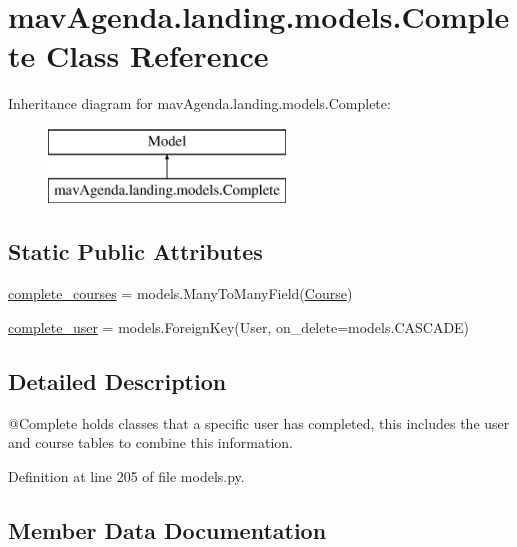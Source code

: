 \hypertarget{classmavAgenda_1_1landing_1_1models_1_1Complete}{}\section{mav\+Agenda.\+landing.\+models.\+Complete Class Reference}
\label{classmavAgenda_1_1landing_1_1models_1_1Complete}
Inheritance diagram for mav\+Agenda.\+landing.\+models.\+Complete\+:\begin{figure}[H]
\begin{center}
\leavevmode
\includegraphics[height=2.000000cm]{classmavAgenda_1_1landing_1_1models_1_1Complete}
\end{center}
\end{figure}
\subsection*{Static Public Attributes}
\begin{DoxyCompactItemize}
\item 
\mbox{\hyperlink{classmavAgenda_1_1landing_1_1models_1_1Complete_a70f2b7ad1a20afb71d3b05fe954afa90}{complete\+\_\+courses}} = models.\+Many\+To\+Many\+Field(\mbox{\hyperlink{classmavAgenda_1_1landing_1_1models_1_1Course}{Course}})
\item 
\mbox{\hyperlink{classmavAgenda_1_1landing_1_1models_1_1Complete_a5956fdb08e5e4809ee8691490cfe6f64}{complete\+\_\+user}} = models.\+Foreign\+Key(User, on\+\_\+delete=models.\+C\+A\+S\+C\+A\+DE)
\end{DoxyCompactItemize}


\subsection{Detailed Description}
\begin{DoxyVerb}@Complete  holds classes that a specific user has completed,
        this includes the user and course tables to combine this information.
\end{DoxyVerb}
 

Definition at line 205 of file models.\+py.



\subsection{Member Data Documentation}
\mbox{\label{classmavAgenda_1_1landing_1_1models_1_1Complete_a70f2b7ad1a20afb71d3b05fe954afa90}} 
